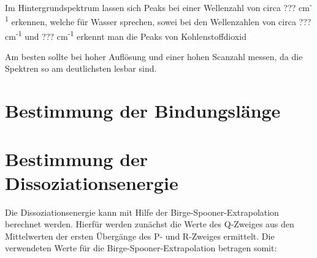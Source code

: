 \documentclass[12pt]{article}
\begin{document}
Im Hintergrundspektrum lassen sich Peaks bei einer Wellenzahl von circa ??? cm\textsuperscript{-1} erkennen, welche für Wasser sprechen, sowei bei den Wellenzahlen von circa ??? cm\textsuperscript{-1} und ??? cm\textsuperscript{-1} erkennt man die Peaks von Kohlenstoffdioxid

Am besten sollte bei hoher Auflösung und einer hohen Scanzahl messen, da die Spektren so am deutlichsten lesbar sind.

\section{Bestimmung der Bindungslänge}

\section{Bestimmung der Dissoziationsenergie}

Die Dissoziationsenergie kann mit Hilfe der Birge-Spooner-Extrapolation berechnet werden. Hierfür werden zunächst die Werte des Q-Zweiges aus den Mittelwerten der ersten Übergänge des P- und R-Zweiges ermittelt.
Die verwendeten Werte für die Birge-Spooner-Extrapolation betragen somit:


\printbibliography
\end{document}
